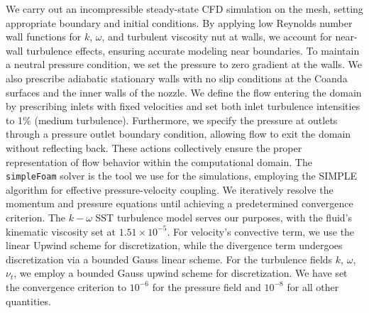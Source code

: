We carry out an incompressible steady-state CFD simulation on the mesh, setting appropriate boundary and initial conditions. By applying low Reynolds number wall functions for $k$, $\omega$, and turbulent viscosity \gls{nut} at walls, we account for near-wall turbulence effects, ensuring accurate modeling near boundaries. To maintain a neutral pressure condition, we set the pressure to zero gradient at the walls. We also prescribe adiabatic stationary walls with no slip conditions at the Coanda surfaces and the inner walls of the nozzle. We define the flow entering the domain by prescribing inlets with fixed velocities and set both inlet turbulence intensities to 1\% (medium turbulence). Furthermore, we specify the pressure at outlets through a pressure outlet boundary condition, allowing flow to exit the domain without reflecting back. These actions collectively ensure the proper representation of flow behavior within the computational domain. The \verb|simpleFoam| solver is the tool we use for the simulations, employing the \gls{SIMPLE} algorithm for effective pressure-velocity coupling. We iteratively resolve the momentum and pressure equations until achieving a predetermined convergence criterion. The $k-\omega$ SST turbulence model serves our purposes, with the fluid's kinematic viscosity set at $1.51 \times {10}^{-5}$. For velocity's convective term, we use the linear Upwind scheme for discretization, while the divergence term undergoes discretization via a bounded Gauss linear scheme. For the turbulence fields $k$, $\omega$, $\nu_t$, we employ a bounded Gauss upwind scheme for discretization. We have set the convergence criterion to ${10}^{-6}$ for the pressure field and ${10}^{-8}$ for all other quantities.
